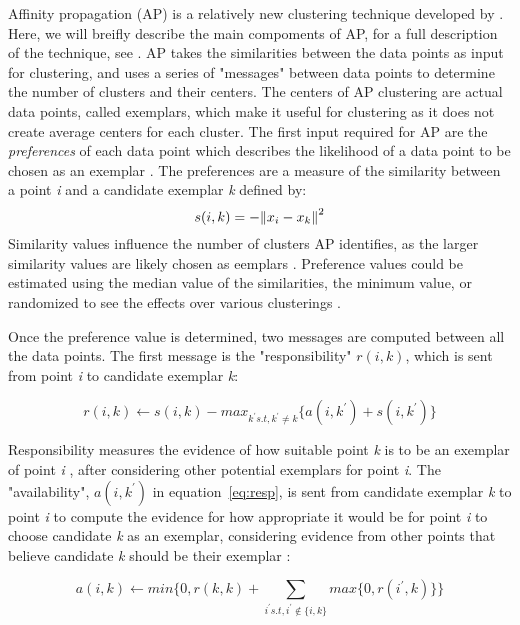 Affinity propagation (AP) is a relatively new clustering technique developed by \citet{frey07}.
Here, we will breifly describe the main compoments of AP, for a full description of the technique, see \citet{frey07}.
AP takes the similarities between the data points as input for clustering, and uses a series of "messages" between data points to determine the number of clusters and their centers.
The centers of AP clustering are actual data points, called exemplars, which make it useful for clustering as it does not create average centers for each cluster. 
The first input required for AP are the \textit{preferences} of each data point which describes the likelihood of a data point to be chosen as an exemplar \citet{frey07}.
The preferences are a measure of the similarity between a point \textit{i} and a candidate exemplar \textit{k} defined by: 
\begin{equation}
\label{eq:sim}
s(i,k) = -\norm{x_i - x_k}^2
\end{equation}
Similarity values influence the number of clusters AP identifies, as the larger similarity values are likely chosen as eemplars \citet{frey07}.
Preference values could be estimated using the median value of the similarities, the minimum value, or randomized to see the effects over various clusterings \citet{frey07}.

Once the preference value is determined, two messages are computed between all the data points.
The first message is the "responsibility" $r(i,k)$, which is sent from point \textit{i} to candidate exemplar \textit{k}:\citet{frey07}

\begin{equation}
\label{eq:resp}
r(i,k) \leftarrow s(i,k) - max_{k^\prime s.t,  k^\prime \neq k} \{ a(i,k^\prime) + s(i,k^\prime) \}
\end{equation}

Responsibility measures the evidence of how suitable point \textit{k} is to be an exemplar of point \textit{i} \citet{frey07}, after considering other potential exemplars for point \textit{i}.
The "availability", $a(i,k^\prime)$ in equation~\ref{eq:resp}, is sent from candidate exemplar \textit{k} to point \textit{i} to compute the evidence for how appropriate it would be for point \textit{i} to choose candidate \textit{k} as an exemplar, considering evidence from other points that believe candidate \textit{k} should be their exemplar \citet{frey07}: 

\begin{equation}
\label{eq:avail}
a(i,k) \leftarrow min\Big\{ 0, r(k,k) + \sum\limits_{i^\prime s.t, i^\prime \notin \{i,k\}} max\{0, r(i^\prime, k)\}\Big\}
\end{equation}


